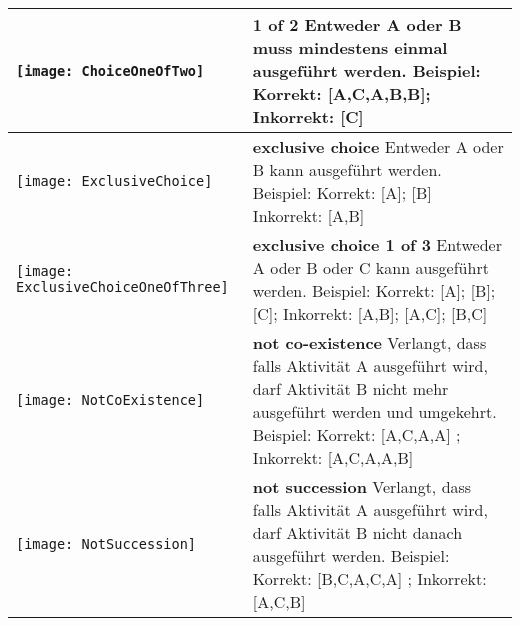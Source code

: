 \begin{longtable}{|p{}|p{}|}
\begin{center}
  \texttt{[image: ChoiceOneOfTwo]} %
    \end{center}&
\textbf{1 of 2} \newline Entweder A oder B muss mindestens einmal ausgeführt werden.\newline
Beispiel: Korrekt: [A,C,A,B,B]; Inkorrekt: [C]\\
\hline

\begin{center}

  \texttt{[image: ExclusiveChoice]} %
    \end{center} &
\textbf{exclusive choice}\newline
  Entweder A oder B kann ausgeführt werden. \newline
  Beispiel:  Korrekt: [A]; [B] Inkorrekt: [A,B] \\
\hline
\begin{center}

  \texttt{[image: ExclusiveChoiceOneOfThree]} %
    \end{center}&
\textbf{exclusive choice 1 of 3} \newline
 Entweder A oder B oder C kann ausgeführt werden. \newline
  Beispiel:  Korrekt: [A]; [B]; [C]; Inkorrekt: [A,B]; [A,C]; [B,C] \\
\hline
\begin{center}

  \texttt{[image: NotCoExistence]} %
    \end{center} &
\textbf{not co-existence}\newline
  Verlangt, dass falls Aktivität A ausgeführt wird, darf Aktivität B nicht mehr ausgeführt werden und umgekehrt.
  \newline
  Beispiel: Korrekt: [A,C,A,A] ; Inkorrekt: [A,C,A,A,B] \\
\hline

\hline
\begin{center}

  \texttt{[image: NotSuccession]} %
    \end{center} &
\textbf{not succession}\newline
  Verlangt, dass falls Aktivität A ausgeführt wird, darf Aktivität B nicht danach ausgeführt werden.
  \newline
  Beispiel: Korrekt: [B,C,A,C,A] ; Inkorrekt: [A,C,B]\\
\hline


\end{longtable}
